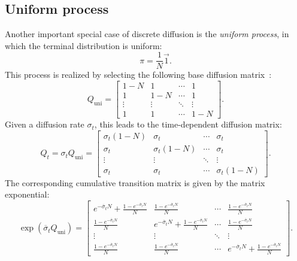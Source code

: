     \subsection{Uniform process}
        \label{app:uniform process}
        Another important special case of discrete diffusion is the \textit{uniform process}, in which the terminal distribution is uniform: 
        $$\pi = \frac{1}{N} \vec{1}.$$
        This process is realized by selecting the following base diffusion matrix~\citep{lou2024discrete}:
        \begin{equation}
            Q_{\text{uni}} =
            \begin{bmatrix}
                1 - N & 1 & \cdots & 1 \\
                1 & 1 - N & \cdots & 1 \\
                \vdots & \vdots & \ddots & \vdots \\
                1 & 1 & \cdots & 1 - N
            \end{bmatrix}.
        \end{equation}
        Given a diffusion rate $\sigma_t$, this leads to the time-dependent diffusion matrix:
        \begin{equation}
        \label{eq: uniform diffusion matrix}
            Q_t = \sigma_t Q_{\text{uni}} =
            \begin{bmatrix}
                \sigma_t(1 - N) & \sigma_t & \cdots & \sigma_t \\
                \sigma_t & \sigma_t(1 - N) & \cdots & \sigma_t \\
                \vdots & \vdots & \ddots & \vdots \\
                \sigma_t & \sigma_t & \cdots & \sigma_t(1 - N)
            \end{bmatrix}.
        \end{equation}
        The corresponding cumulative transition matrix is given by the matrix exponential:
        \begin{equation}
            \exp(\overline{\sigma}_t Q_{\text{uni}}) =
            \begin{bmatrix}
                e^{-\overline{\sigma}_t N} + \frac{1 - e^{-\overline{\sigma}_t N}}{N} & \frac{1 - e^{-\overline{\sigma}_t N}}{N} & \cdots & \frac{1 - e^{-\overline{\sigma}_t N}}{N} \\
                \frac{1 - e^{-\overline{\sigma}_t N}}{N} & e^{-\overline{\sigma}_t N} + \frac{1 - e^{-\overline{\sigma}_t N}}{N} & \cdots & \frac{1 - e^{-\overline{\sigma}_t N}}{N} \\
                \vdots & \vdots & \ddots & \vdots \\
                \frac{1 - e^{-\overline{\sigma}_t N}}{N} & \frac{1 - e^{-\overline{\sigma}_t N}}{N} & \cdots & e^{-\overline{\sigma}_t N} + \frac{1 - e^{-\overline{\sigma}_t N}}{N}
            \end{bmatrix}.
        \end{equation}
        
